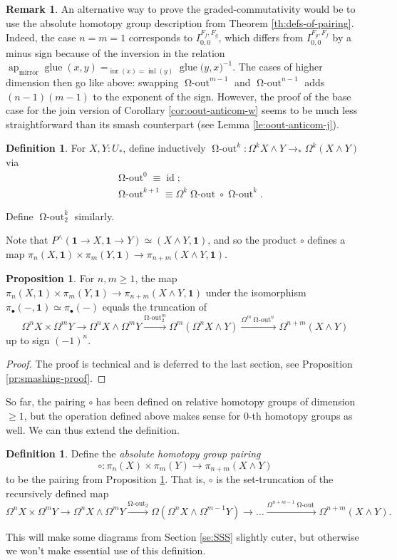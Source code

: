 \documentclass{amsart}
\theoremstyle{definition}
\newtheorem{prp}[theorem]{Proposition}
\newtheorem{de}[theorem]{Definition}
\newtheorem{re}[theorem]{Remark}
\newcommand{\id}{\operatorname{id}}
\newcommand{\ap}{\operatorname{ap}}
\newcommand{\inl}{\operatorname{inl}}
\newcommand{\inr}{\operatorname{inr}}
\newcommand{\glue}{\operatorname{glue}}
\newcommand{\pto}{\to_*}
\newcommand{\oout}{\operatorname{\Omega-out}}
\newcommand{\sgtn}{\mathbf{1}}
\newcommand{\ooutk}[1]{\operatorname{\Omega-out}^{#1}}
\newcommand{\mir}{\operatorname{mirror}}
\begin{document}
\begin{re}
    An alternative way to prove the graded-commutativity would be to use the absolute homotopy group description from Theorem \ref{th:defs-of-pairing}. Indeed, the case $n=m=1$ corresponds to $I_{0,0}^{F_f,F_g}$, which differs from $I_{0,0}^{F_g,F_f}$ by a minus sign because of the inversion in the relation $\ap_{\mir}\glue(x,y)=_{\inr(x) = \inl(y)}\glue({y,x)^{-1}}$. The cases of higher dimension then go like above: swapping $\ooutk{m-1}$ and $\ooutk{n-1}$ adds $(n-1)(m-1)$ to the exponent of the sign. However, the proof of the base case for the join version of Corollary \ref{cor:oout-anticom-w} seems to be much less straightforward than its smash counterpart (see Lemma \ref{le:oout-anticom-j}).
\end{re}


\begin{de}\label{de:ooutk}
    For $X, Y: U_*$, define inductively $\ooutk{k}: \Omega^k X \wedge Y \pto \Omega^k (X \wedge Y)$ via
    \begin{align*}
        & \ooutk{0} \equiv \id; \\
        & \ooutk{k+1} \equiv \Omega^k \oout \circ \ooutk{k}.
    \end{align*}
\end{de}
\noindent
Define $\ooutk{k}_2$ similarly.

Note that $P^\wedge(\sgtn \to X, \sgtn \to Y) \simeq (X \wedge Y, \sgtn)$, and so the product $\circ$ defines a map $\pi_n(X,\sgtn) \times \pi_m(Y,\sgtn) \to \pi_{n+m}(X \wedge Y,\sgtn)$.
\begin{prp}\label{pr:smashing}
    For $n,m \geq 1$, the map $\pi_n(X,\sgtn) \times \pi_m(Y,\sgtn) \to \pi_{n+m}(X \wedge Y,\sgtn)$
    under the isomorphism $\pi_\bullet(-, \sgtn) \simeq \pi_{\bullet}(-)$
    equals the truncation of
    $$\Omega^n X \times \Omega^m Y \to \Omega^n X \wedge \Omega^m Y \xrightarrow{\ooutk{m}_2} \Omega^m (\Omega^n X \wedge Y) \xrightarrow{\Omega^m \ooutk{n}} \Omega^{n+m} (X \wedge Y)$$
    up to sign $(-1)^n$.
\end{prp}

\begin{proof}
    The proof is technical and is deferred to the last section, see Proposition \ref{pr:smashing-proof}.
\end{proof}


So far, the pairing $\circ$ has been defined on relative homotopy groups of dimension $\geq 1$, but the operation defined above makes sense for $0$-th homotopy groups as well. We can thus extend the definition.
\begin{de}\label{de:circ-absolute}
    Define the \textit{absolute homotopy group pairing}
    $$\circ: \pi_n(X) \times \pi_m(Y) \to \pi_{n+m}(X \wedge Y)$$
    to be the pairing from Proposition \ref{pr:smashing}. That is, $\circ$ is the set-truncation of the recursively defined map
    $$\Omega^n X \times \Omega^m Y \to \Omega^n X \wedge \Omega^m Y \xrightarrow{\oout_2} \Omega (\Omega^{n} X \wedge \Omega^{m-1} Y) \to \ldots \xrightarrow{\Omega^{n+m-1}\oout} \Omega^{n+m}(X \wedge Y).$$
\end{de}
\noindent
This will make some diagrams from Section \ref{se:SSS} slightly cuter, but otherwise we won't make essential use of this definition.
\end{document}
